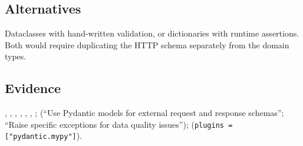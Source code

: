 \subsection*{Alternatives}

Dataclasses with hand-written validation, or dictionaries with runtime
assertions. Both would require duplicating the HTTP schema separately from the
domain types.

\subsection*{Evidence}

,
, , ,
, , ;
 (``Use Pydantic models for external request and response
schemas''; ``Raise specific exceptions for data quality issues'');
 (\texttt{plugins = ["pydantic.mypy"]}).

